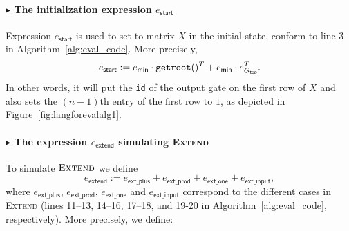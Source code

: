 \paragraph{$\blacktriangleright$ The initialization expression $e_{\mathsf{start}}$}
Expression $e_{\mathsf{start}}$ is used to set to matrix $X$ in the initial state, conform to line 3 in Algorithm~\ref{alg:eval_code}. More precisely,
$$e_{\mathsf{start}}:=e_{\mathsf{min}}\cdot \texttt{getroot}()^T + e_{\mathsf{min}}\cdot e_{G_{\mathsf{top}}}^T.$$
In other words, it will put the \texttt{id} of the output gate on the first row of $X$ and also sets the $(n-1)$th entry  of the first row to $1$,
as depicted in Figure~\ref{fig:langforevalalg1}. 

\paragraph{$\blacktriangleright$ The expression $e_{\mathsf{extend}}$ simulating {\normalfont\textsc{Extend}}}
To simulate $\textsc{Extend}$ we define
$$
e_{\mathsf{extend}}:=e_{\mathsf{ext\_plus}}+e_{\mathsf{ext\_prod}}+e_{\mathsf{ext\_one}}+e_{\mathsf{ext\_input}},
$$
where  $e_{\mathsf{ext\_plus}}$, $e_{\mathsf{ext\_prod}}$, $e_{\mathsf{ext\_one}}$ and $e_{\mathsf{ext\_input}}$ correspond to the different cases in \textsc{Extend} (lines 11--13, 14--16, 17--18, and 19-20 in Algorithm~\ref{alg:eval_code}, respectively). More precisely, we define:
